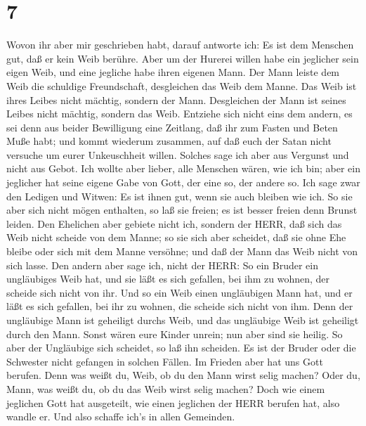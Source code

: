 \hypertarget{section-6}{%
\section{7}\label{section-6}}

 Wovon ihr aber mir geschrieben habt, darauf antworte ich:
Es ist dem Menschen gut, daß er kein Weib berühre.  Aber um
der Hurerei willen habe ein jeglicher sein eigen Weib, und eine jegliche
habe ihren eigenen Mann.  Der Mann leiste dem Weib die
schuldige Freundschaft, desgleichen das Weib dem Manne.  Das
Weib ist ihres Leibes nicht mächtig, sondern der Mann. Desgleichen der
Mann ist seines Leibes nicht mächtig, sondern das Weib. 
Entziehe sich nicht eins dem andern, es sei denn aus beider Bewilligung
eine Zeitlang, daß ihr zum Fasten und Beten Muße habt; und kommt
wiederum zusammen, auf daß euch der Satan nicht versuche um eurer
Unkeuschheit willen.  Solches sage ich aber aus Vergunst und
nicht aus Gebot.  Ich wollte aber lieber, alle Menschen
wären, wie ich bin; aber ein jeglicher hat seine eigene Gabe von Gott,
der eine so, der andere so.  Ich sage zwar den Ledigen und
Witwen: Es ist ihnen gut, wenn sie auch bleiben wie ich.  So
sie aber sich nicht mögen enthalten, so laß sie freien; es ist besser
freien denn Brunst leiden.  Den Ehelichen aber gebiete
nicht ich, sondern der HERR, daß sich das Weib nicht scheide von dem
Manne;  so sie sich aber scheidet, daß sie ohne Ehe bleibe
oder sich mit dem Manne versöhne; und daß der Mann das Weib nicht von
sich lasse.  Den andern aber sage ich, nicht der HERR: So
ein Bruder ein ungläubiges Weib hat, und sie läßt es sich gefallen, bei
ihm zu wohnen, der scheide sich nicht von ihr.  Und so ein
Weib einen ungläubigen Mann hat, und er läßt es sich gefallen, bei ihr
zu wohnen, die scheide sich nicht von ihm.  Denn der
ungläubige Mann ist geheiligt durchs Weib, und das ungläubige Weib ist
geheiligt durch den Mann. Sonst wären eure Kinder unrein; nun aber sind
sie heilig.  So aber der Ungläubige sich scheidet, so laß
ihn scheiden. Es ist der Bruder oder die Schwester nicht gefangen in
solchen Fällen. Im Frieden aber hat uns Gott berufen.  Denn
was weißt du, Weib, ob du den Mann wirst selig machen? Oder du, Mann,
was weißt du, ob du das Weib wirst selig machen?  Doch wie
einem jeglichen Gott hat ausgeteilt, wie einen jeglichen der HERR
berufen hat, also wandle er. Und also schaffe ich's in allen Gemeinden.
